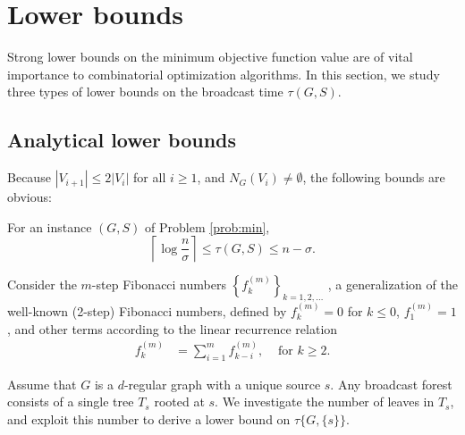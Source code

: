 \section{Lower bounds} \label{sec:lb}
Strong lower bounds on the minimum objective function value are of vital importance to combinatorial optimization algorithms.
In this section, we study three types of lower bounds on the broadcast time $\tau(G,S)$.

\subsection{Analytical lower bounds} \label{sec:lbanalyt}
Because $\left|V_{i+1}\right|\leq 2\left|V_i\right|$ for all $i\geq 1$, and $N_G\left(V_i\right)\neq\emptyset$, the following bounds are obvious:
\begin{observation}
For an instance $(G,S)$ of Problem \ref{prob:min},
\begin{equation}
\left\lceil\log\frac{n}{\sigma}\right\rceil\leq \tau(G,S) \leq n-\sigma.
\label{eq:loglb}
\end{equation}
\label{obs:loglb}
\end{observation}

Consider the $m$-step Fibonacci numbers $\left\{f^{(m)}_k\right\}_{k=1,2,\ldots}$ \cite{noe05}, a generalization of the well-known (2-step) Fibonacci numbers, defined by
$f^{(m)}_k=0$ for $k\leq 0$, $f^{(m)}_1=1$, and 
other terms according to the linear recurrence relation 
\begin{align*}
f^{(m)}_k &=\sum\limits_{i=1}^m f^{(m)}_{k-i}, &\text{ for } k\geq 2.
\end{align*}

Assume that $G$ is a $d$-regular graph with a unique source $s$.
Any broadcast forest consists of a single tree $T_s$ rooted at $s$.
We investigate the number of leaves in $T_s$, and exploit this number to derive a lower bound on $\tau\{G,\{s\}\}$.

